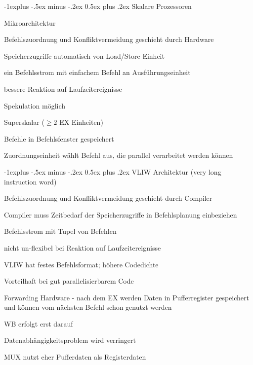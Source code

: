 \documentclass[10pt,landscape]{article}
\makeatletter
\renewcommand{\subsection}{\@startsection{subsection}{2}{0mm}%
                                {-1explus -.5ex minus -.2ex}%
                                {0.5ex plus .2ex}%
                                {\normalfont\normalsize\bfseries}}
\makeatother
\begin{document}
\begin{multicols}{3}
  \subsection{Skalare Prozessoren}
  \begin{itemize*}
    \item Mikroarchitektur
    \item Befehlszuordnung und Konfliktvermeidung geschieht durch Hardware
    \item Speicherzugriffe automatisch von Load/Store Einheit
    \item ein Befehlsstrom mit einfachem Befehl an Ausführungseinheit
    \item bessere Reaktion auf Laufzeitereignisse
    \item Spekulation möglich
    \item Superskalar ($\geq 2$ EX Einheiten)
    \begin{itemize*}
      \item Befehle in Befehlsfenster gespeichert
      \item Zuordnungseinheit wählt Befehl aus, die parallel verarbeitet werden können
    \end{itemize*}
  \end{itemize*}
  
  \subsection{VLIW Architektur (very long instruction word)}
  \begin{itemize*}
    \item Befehlszuordnung und Konfliktvermeidung geschieht durch Compiler
    \item Compiler muss Zeitbedarf der Speicherzugriffe in Befehlsplanung einbeziehen
    \item Befehlsstrom mit Tupel von Befehlen
    \item nicht un-flexibel bei Reaktion auf Laufzeitereignisse
    \item VLIW hat festes Befehlsformat; höhere Codedichte
    \item Vorteilhaft bei gut parallelisierbarem Code
    \item Forwarding Hardware - nach dem EX werden Daten in Pufferregister gespeichert und können vom nächsten Befehl schon genutzt werden
    \item WB erfolgt erst darauf
    \item Datenabhängigkeitsproblem wird verringert
    \item MUX nutzt eher Pufferdaten als Registerdaten
  \end{itemize*}
  

\end{multicols}
\end{document}
